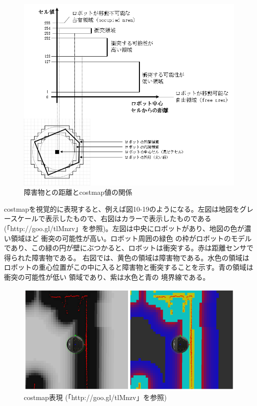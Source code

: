 \begin{figure}[htp]
  \centering
  \includegraphics[width=\columnwidth]{pictures/chapter10/pic_10_18.png}
  \caption{障害物との距離とcostmap値の関係}
\end{figure}

costmapを視覚的に表現すると、例えば図10-19のようになる。左図は地図をグレースケールで表示したもので、右図はカラーで表示したものである (「http://goo.gl/tlMnzv」を参照)。左図は中央にロボットがあり、地図の色が濃い領域ほど  衝突の可能性が高い。ロボット周囲の緑色  の枠がロボットのモデルであり、この緑の円が壁にぶつかると、ロボットは衝突する。赤は距離センサで得られた障害物である。
右図では、黄色の領域は障害物である。水色の領域はロボットの重心位置がこの中に入ると障害物と衝突することを示す。青の領域は衝突の可能性が低い  領域であり、紫は水色と青の  境界線である。

\begin{figure}[htp]
  \centering
  \includegraphics[width=\columnwidth]{pictures/chapter10/pic_10_19.png}
  \caption{costmap表現 (「http://goo.gl/tlMnzv」を参照)}
\end{figure}

